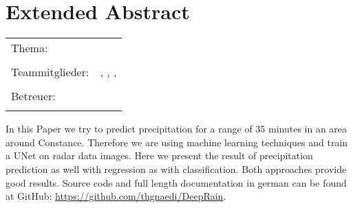 \chapter*{Extended Abstract}

\begin{center}
	\begingroup
	\renewcommand*{\arraystretch}{1}
	{\makeatletter	
		\begin{tabular}{p{3.2cm}p{9.6cm}}
			Thema: & \thema \\
			& \\
			Teammitglieder: & \verfasserA, \verfasserB, \verfasserC, \verfasserD \\
			& \\
			Betreuer: & \hoschschule \newline \institut \newline \prueferA \\
			& \\
		\end{tabular}
		
		\makeatother}
	\endgroup
\end{center}

\bigskip

In this Paper we try to predict precipitation for a range of 35 minutes in an area around Constance.
Therefore we are using machine learning techniques and train a UNet on radar data images. 
Here we present the result of precipitation prediction as well with regression as with classification. 
Both approaches provide good results. Source code and full length documentation in german can be found at GitHub: \url{https://github.com/thgnaedi/DeepRain}.


\printbibliography[title={Referenzen}, heading=subbibliography]

